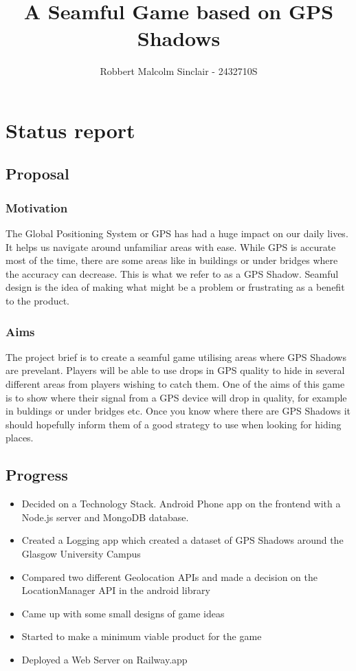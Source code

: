 \documentclass[11pt]{article}
\title{ A Seamful Game based on GPS Shadows }
\author{ Robbert Malcolm Sinclair - 2432710S }
\begin{document}
    \maketitle
    

\section{Status report}

\subsection{Proposal}\label{proposal}

\subsubsection{Motivation}\label{motivation}


The Global Positioning System or GPS has had a huge impact on our daily lives. It helps us navigate around unfamiliar areas with ease. While GPS is accurate most of the time, there
are some areas like in buildings or under bridges where the accuracy can decrease. This is what we refer to as a GPS Shadow. Seamful design is the idea of making what might be
a problem or frustrating as a benefit to the product. 


\subsubsection{Aims}\label{aims}

The project brief is to create a seamful game utilising areas where GPS Shadows are prevelant. Players will be able to use drops in GPS quality to hide in several different areas
from players wishing to catch them. One of the aims of this game is to show where their signal from a GPS device will drop in quality, for example in buldings or under bridges etc.
Once you know where there are GPS Shadows it should hopefully inform them of a good strategy to use when looking for hiding places.

\subsection{Progress}\label{progress}

\begin{itemize}
    \tightlist
\item Decided on a Technology Stack. Android Phone app on the frontend with a Node.js server and MongoDB database. 
\item Created a Logging app which created a dataset of GPS Shadows around the Glasgow University Campus
\item Compared two different Geolocation APIs and made a decision on the LocationManager API in the android library
\item Came up with some small designs of game ideas
\item Started to make a minimum viable product for the game
\item Deployed a Web Server on Railway.app

\end{itemize}
\end{document}

